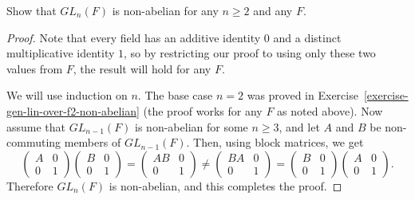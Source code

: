  Show that $GL_n(F)$ is non-abelian for any $n\geq2$ and any
$F$.
\begin{proof}
  Note that every field has an additive identity $0$ and a distinct
  multiplicative identity $1$, so by restricting our proof to using
  only these two values from $F$, the result will hold for any $F$.

  We will use induction on $n$. The base case $n = 2$ was proved in
  Exercise~\ref{exercise-gen-lin-over-f2-non-abelian} (the proof works
  for any $F$ as noted above). Now assume that $GL_{n-1}(F)$ is
  non-abelian for some $n\geq3$, and let $A$ and $B$ be non-commuting
  members of $GL_{n-1}(F)$. Then, using block matrices, we get
  \begin{equation*}
    \begin{pmatrix}
      A & 0 \\
      0 & 1
    \end{pmatrix}
    \begin{pmatrix}
      B & 0 \\
      0 & 1
    \end{pmatrix}
    =
    \begin{pmatrix}
      AB & 0 \\
      0 & 1
    \end{pmatrix}
    \neq
    \begin{pmatrix}
      BA & 0 \\
      0 & 1
    \end{pmatrix}
    =
    \begin{pmatrix}
      B & 0 \\
      0 & 1
    \end{pmatrix}
    \begin{pmatrix}
      A & 0 \\
      0 & 1
    \end{pmatrix}.
  \end{equation*}
  Therefore $GL_n(F)$ is non-abelian, and this completes the proof.
\end{proof}

